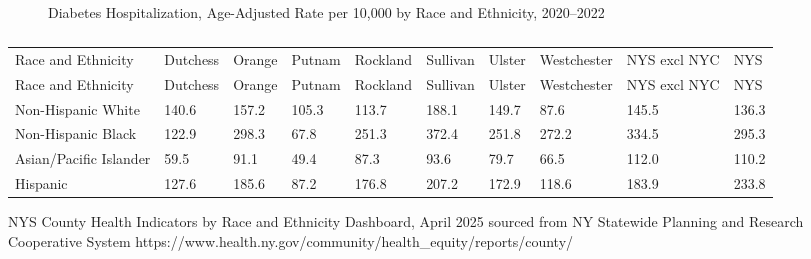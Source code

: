 \documentclass[
  english,
  letterpaper,
]{report}
\begin{document}
\begin{figure}


\caption{\label{fig-dm-hospital-rande-aar}Diabetes Hospitalization,
Age-Adjusted Rate per 10,000 by Race and Ethnicity, 2020--2022}

\end{figure}%

\begin{longtable}[]{@{}llllllllll@{}}

\caption{\label{tbl-dm-hospital-rande-aar}Diabetes Hospitalization,
Age-Adjusted Rate per 10,000 by Race and Ethnicity, 2020--2022}

\tabularnewline

\caption{}\label{T_b55a4}\tabularnewline
\toprule\noalign{}
Race and Ethnicity & Dutchess & Orange & Putnam & Rockland & Sullivan &
Ulster & Westchester & NYS excl NYC & NYS \\
\midrule\noalign{}
\endfirsthead
\toprule\noalign{}
Race and Ethnicity & Dutchess & Orange & Putnam & Rockland & Sullivan &
Ulster & Westchester & NYS excl NYC & NYS \\
\midrule\noalign{}
\endhead
\bottomrule\noalign{}
\endlastfoot
Non-Hispanic White & 140.6 & 157.2 & 105.3 & 113.7 & 188.1 & 149.7 &
87.6 & 145.5 & 136.3 \\
Non-Hispanic Black & 122.9 & 298.3 & 67.8 & 251.3 & 372.4 & 251.8 &
272.2 & 334.5 & 295.3 \\
Asian/Pacific Islander & 59.5 & 91.1 & 49.4 & 87.3 & 93.6 & 79.7 & 66.5
& 112.0 & 110.2 \\
Hispanic & 127.6 & 185.6 & 87.2 & 176.8 & 207.2 & 172.9 & 118.6 & 183.9
& 233.8 \\

\end{longtable}

\begin{tcolorbox}[enhanced jigsaw, breakable, leftrule=.75mm, title=\textcolor{quarto-callout-note-color}{\faInfo}\hspace{0.5em}{Source}, bottomrule=.15mm, opacityback=0, left=2mm, colback=white, bottomtitle=1mm, coltitle=black, colbacktitle=quarto-callout-note-color!10!white, colframe=quarto-callout-note-color-frame, opacitybacktitle=0.6, toptitle=1mm, titlerule=0mm, arc=.35mm, rightrule=.15mm, toprule=.15mm]

NYS County Health Indicators by Race and Ethnicity Dashboard, April 2025
sourced from NY Statewide Planning and Research Cooperative System
https://www.health.ny.gov/community/health\_equity/reports/county/

\end{tcolorbox}
\end{document}
